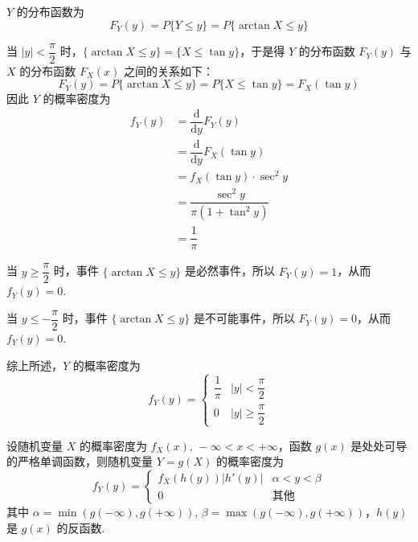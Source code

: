 \begin{solution}
    $Y$ 的分布函数为
    $$
    F_{Y}(y) = P\{Y \leqslant y\} = P\{\arctan X \leqslant y\}
    $$

    当 $|y|<\dfrac{\pi}{2}$ 时，$\{\arctan X \leqslant y\}=\{X \leqslant \tan y\}$，于是得 $Y$ 的分布函数 $F_{Y}(y)$ 与 $X$ 的分布函数 $F_{X}(x)$ 之间的关系如下：
    $$
    F_{Y}(y) = P\{\arctan X \leqslant y\} = P\{X \leqslant \tan y\} = F_{X}(\tan y)
    $$
    因此 $Y$ 的概率密度为
    $$
    \begin{aligned}
        f_{Y}(y) &= \dfrac{\text{d}}{\text{d}y} F_{Y}(y) \\
        &= \dfrac{\text{d}}{\text{d}y} F_{X}(\tan y) \\
        &= f_{X}(\tan y) \cdot \sec^2 y \\
        &= \dfrac{\sec^2 y}{\pi (1+\tan^2 y)} \\
        &= \dfrac{1}{\pi}
    \end{aligned}
    $$

    当 $y \geqslant \dfrac{\pi}{2}$ 时，事件 $\{\arctan X \leqslant y\}$ 是必然事件，所以 $F_{Y}(y)=1$，从而 $f_{Y}(y)=0$.
    \vspace{0.5em}

    当 $y \leqslant -\dfrac{\pi}{2}$ 时，事件 $\{\arctan X \leqslant y\}$ 是不可能事件，所以 $F_{Y}(y)=0$，从而 $f_{Y}(y)=0$.

    综上所述，$Y$ 的概率密度为
    $$
    f_{Y}(y)=\begin{cases}
        \dfrac{1}{\pi} & |y| < \dfrac{\pi}{2} \\[0.5em]
        0 & |y| \geqslant \dfrac{\pi}{2}
    \end{cases}
    $$
\end{solution}

\begin{theorem} \label{theorem:f(y)}
    设随机变量 $X$ 的概率密度为 $f_{X}(x), \, -\infty < x < +\infty$，函数 $g(x)$ 是处处可导的严格单调函数，则随机变量 $Y=g(X)$ 的概率密度为
    $$
    f_{Y}(y)=\begin{cases}
        f_{X}(h(y))|h'(y)| & \alpha < y < \beta \\[-0.6em]
        0 & \text{其他}
    \end{cases}
    $$
    其中 $\alpha = \min(g(-\infty),g(+\infty)), \, \beta = \max(g(-\infty),g(+\infty))$，$h(y)$ 是 $g(x)$ 的反函数.
\end{theorem}

